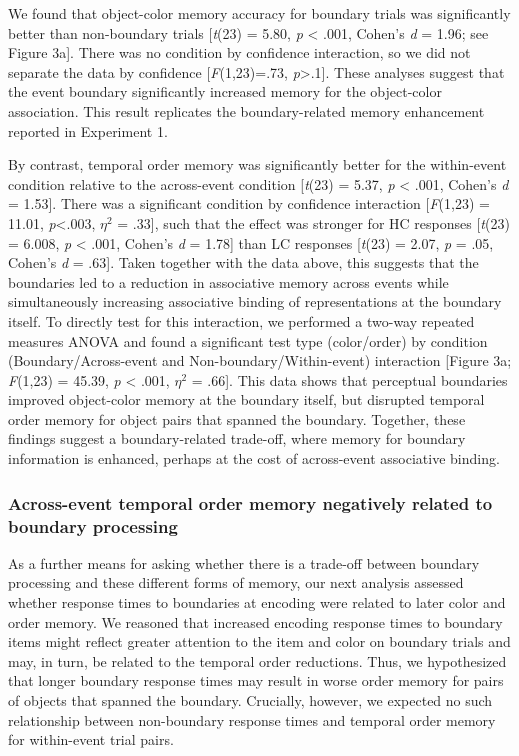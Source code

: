 We found that object-color memory accuracy for boundary trials was
significantly better than non-boundary trials {[}\emph{t}(23) = 5.80,
\emph{p} \textless{} .001, Cohen's \emph{d} = 1.96; see Figure 3a{]}.
There was no condition by confidence interaction, so we did not separate
the data by confidence {[}\emph{F}(1,23)=.73,
\emph{p}\textgreater{}.1{]}. These analyses suggest that the event
boundary significantly increased memory for the object-color
association. This result replicates the boundary-related memory
enhancement reported in Experiment 1.

By contrast, temporal order memory was significantly better for the
within-event condition relative to the across-event condition
{[}\emph{t}(23) = 5.37, \emph{p} \textless{} .001, Cohen's \emph{d} =
1.53{]}. There was a significant condition by confidence interaction
{[}\emph{F}(1,23) = 11.01, \emph{p}\textless{}.003, \(\eta^{2}\) =
.33{]}, such that the effect was stronger for HC responses
{[}\emph{t}(23) = 6.008, \emph{p} \textless{} .001, Cohen's \emph{d} =
1.78{]} than LC responses {[}\emph{t}(23) = 2.07, \emph{p} = .05,
Cohen's \emph{d} = .63{]}. Taken together with the data above, this
suggests that the boundaries led to a reduction in associative memory
across events while simultaneously increasing associative binding of
representations at the boundary itself. To directly test for this
interaction, we performed a two-way repeated measures ANOVA and found a
significant test type (color/order) by condition (Boundary/Across-event
and Non-boundary/Within-event) interaction {[}Figure 3a; \emph{F}(1,23)
= 45.39, \emph{p} \textless{} .001, \(\eta^{2}\) = .66{]}. This data
shows that perceptual boundaries improved object-color memory at the
boundary itself, but disrupted temporal order memory for object pairs
that spanned the boundary. Together, these findings suggest a
boundary-related trade-off, where memory for boundary information is
enhanced, perhaps at the cost of across-event associative binding.

\subsubsection{Across-event temporal order memory negatively related to
boundary
processing}\label{across-event-temporal-order-memory-negatively-related-to-boundary-processing}

As a further means for asking whether there is a trade-off between
boundary processing and these different forms of memory, our next
analysis assessed whether response times to boundaries at encoding were
related to later color and order memory. We reasoned that increased
encoding response times to boundary items might reflect greater
attention to the item and color on boundary trials and may, in turn, be
related to the temporal order reductions. Thus, we hypothesized that
longer boundary response times may result in worse order memory for
pairs of objects that spanned the boundary. Crucially, however, we
expected no such relationship between non-boundary response times and
temporal order memory for within-event trial pairs.

